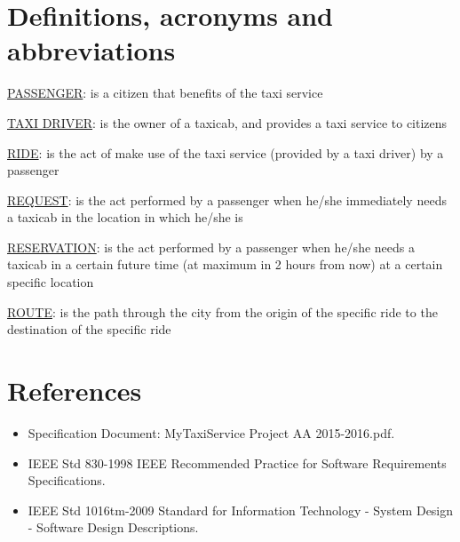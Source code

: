 \section{Definitions, acronyms and abbreviations}
\begin{description}
	\item \underline{PASSENGER}: is a citizen that benefits of the taxi service
	\item \underline{TAXI DRIVER}: is the owner of a taxicab, and provides a taxi service to citizens
	\item \underline{RIDE}: is the act of make use of the taxi service (provided by a taxi driver) by a passenger
	\item \underline{REQUEST}: is the act performed by a passenger when he/she immediately needs a taxicab in the location in which he/she is 
	\item \underline{RESERVATION}: is the act performed by a passenger when he/she needs a taxicab in a certain future time (at maximum in 2 hours from now) at a certain specific location
	\item \underline{ROUTE}: is the path through the city from the origin of the specific ride to the destination of the specific ride
\end{description}

\section{References}
\begin{itemize}
	\item Specification Document: MyTaxiService Project AA 2015-2016.pdf.
	\item IEEE Std 830-1998 IEEE Recommended Practice for Software Requirements Specifications.
	\item IEEE Std 1016tm-2009 Standard for Information Technology - System Design - Software Design Descriptions.
\end{itemize}

